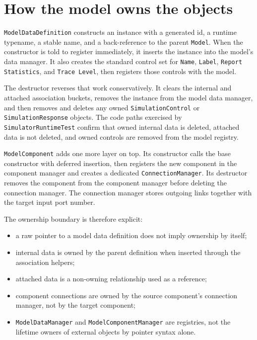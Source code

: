 \section{How the model owns the objects}
\label{sec:model-component-ownership}

\texttt{ModelDataDefinition} constructs an instance with a generated id, a runtime
typename, a stable name, and a back-reference to the parent \texttt{Model}. When the
constructor is told to register immediately, it inserts the instance into the
model's data manager. It also creates the standard control set for \texttt{Name},
\texttt{Label}, \texttt{Report Statistics}, and \texttt{Trace Level}, then registers those controls
with the model.

The destructor reverses that work conservatively. It clears the internal and
attached association buckets, removes the instance from the model data manager,
and then removes and deletes any owned \texttt{SimulationControl} or
\texttt{SimulationResponse} objects. The code paths exercised by
\texttt{SimulatorRuntimeTest} confirm that owned internal data is deleted, attached
data is not deleted, and owned controls are removed from the model registry.

\texttt{ModelComponent} adds one more layer on top. Its constructor calls the base
constructor with deferred insertion, then registers the new component in the
component manager and creates a dedicated \texttt{ConnectionManager}. Its destructor
removes the component from the component manager before deleting the connection
manager. The connection manager stores outgoing links together with the target
input port number.

The ownership boundary is therefore explicit:
\begin{itemize}
\item a raw pointer to a model data definition does not imply ownership by
      itself;
\item internal data is owned by the parent definition when inserted through
      the association helpers;
\item attached data is a non-owning relationship used as a reference;
\item component connections are owned by the source component's connection
      manager, not by the target component;
\item \texttt{ModelDataManager} and \texttt{ModelComponentManager} are registries, not the
      lifetime owners of external objects by pointer syntax alone.
\end{itemize}

